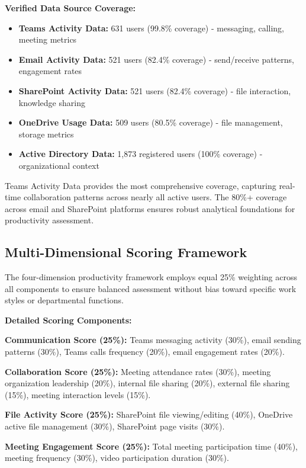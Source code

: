 \documentclass[12pt,a4paper]{article}
\begin{document}
\begin{featurebox}
\textbf{\faDatabase \quad Verified Data Source Coverage:}
\begin{itemize}
    \item \textbf{Teams Activity Data:} 631 users (99.8\% coverage) - messaging, calling, meeting metrics
    \item \textbf{Email Activity Data:} 521 users (82.4\% coverage) - send/receive patterns, engagement rates
    \item \textbf{SharePoint Activity Data:} 521 users (82.4\% coverage) - file interaction, knowledge sharing
    \item \textbf{OneDrive Usage Data:} 509 users (80.5\% coverage) - file management, storage metrics
    \item \textbf{Active Directory Data:} 1,873 registered users (100\% coverage) - organizational context
\end{itemize}
\end{featurebox}

Teams Activity Data provides the most comprehensive coverage, capturing real-time collaboration patterns across nearly all active users. The 80\%+ coverage across email and SharePoint platforms ensures robust analytical foundations for productivity assessment.

\subsection{Multi-Dimensional Scoring Framework}

The four-dimension productivity framework employs equal 25\% weighting across all components to ensure balanced assessment without bias toward specific work styles or departmental functions.

\begin{infobox}
\textbf{\faCog \quad Detailed Scoring Components:}

\textbf{Communication Score (25\%):} Teams messaging activity (30\%), email sending patterns (30\%), Teams calls frequency (20\%), email engagement rates (20\%).

\textbf{Collaboration Score (25\%):} Meeting attendance rates (30\%), meeting organization leadership (20\%), internal file sharing (20\%), external file sharing (15\%), meeting interaction levels (15\%).

\textbf{File Activity Score (25\%):} SharePoint file viewing/editing (40\%), OneDrive active file management (30\%), SharePoint page visits (30\%).

\textbf{Meeting Engagement Score (25\%):} Total meeting participation time (40\%), meeting frequency (30\%), video participation duration (30\%).
\end{infobox}
\end{document}
